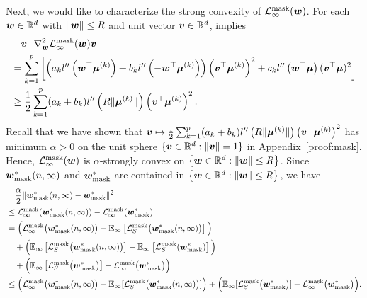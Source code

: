 Next, we would like to characterize the strong convexity of  $\mathcal{L}_\infty^\mathrm{mask}(\vw)$.
For each $\vw \in \mathbb{R}^d$ with $\lVert \vw \rVert \leq R$ and unit vector $\vv \in \mathbb{R}^d$,   implies
\begin{align*}
 &\quad \vv^\top \nabla_\vw^2 \mathcal{L}_\infty^\mathrm{mask}(\vw)\vv \\
 &=  \sum_{k=1}^p \left[ \left(a_k l''\left(\vw^\top \vmu^{(k)}\right) + b_k l''\left(-\vw^\top \vmu^{(k)}\right)\right) \left(\vv^\top \vmu^{(k)}\right)^2 + c_k l''\left(\vw^\top \vmu \right)(\vv^\top \vmu)^2 \right]\\
 &\geq \frac{1}{2} \sum_{k=1}^p (a_k + b_k) l''\left (R\lVert \vmu^{(k)}\rVert \right) \left(\vv^\top \vmu^{(k)} \right)^2.
\end{align*}
Recall that we have shown that $\vv \mapsto \frac{1}{2} \sum_{k=1}^p (a_k + b_k) l''\left ( R\lVert \vmu^{(k)}\rVert \right) \left(\vv^\top \vmu^{(k)} \right)^2$ has minimum $\alpha>0$ on the unit sphere $\{ \vv \in \mathbb{R}^d:\lVert \vv\rVert=1 \}$ in Appendix~\ref{proof:mask}. Hence, $\mathcal{L}_\infty^\mathrm{mask}(\vw)$ is $\alpha$-strongly convex on $\left \{\vw\in \mathbb{R}^d : \lVert \vw \rVert \leq R \right \}$. Since $ \wmask[\infty]$ and $\vw_{\mathrm{mask}}^*$ are contained in $ \left \{\vw\in \mathbb{R}^d : \lVert \vw \rVert \leq R \right \}$, we have
\begin{align*}
    &\quad \frac{\alpha}{2} \lVert \wmask[\infty] - \vw_{\mathrm{mask}}^* \rVert^2\\
    &\leq \mathcal{L}_\infty^{\mathrm{mask}}(\wmask[\infty]) - \mathcal{L}_\infty^{\mathrm{mask}}(\vw_{\mathrm{mask}}^*)\\
    &= \Big( \mathcal{L}_\infty^{\mathrm{mask}}\big(\wmask[\infty]\big)-\mathbb{E}_\infty \left [\lossmask \big (\wmask[\infty] \big) \right ]\Big) \\
    &\quad + \Big(\mathbb{E}_\infty \left [\lossmask \big (\wmask[\infty] \big) \right ]-\mathbb{E}_\infty \left [\lossmask (\vw_{\mathrm{mask}}^*  ) \right ] \Big)\\
    &\quad +\Big( \mathbb{E}_\infty \left [\lossmask\big(\vw_{\mathrm{mask}}^*\big) \right ] - \mathcal{L}_\infty^{\mathrm{mask}}\big(\vw_{\mathrm{mask}}^*\big) \Big)\\
    &\leq \Big( \mathcal{L}_\infty^{\mathrm{mask}}\big(\wmask[\infty]\big)-\mathbb{E}_\infty[\lossmask\big(\wmask[\infty]\big)]\Big)
    +\Big( \mathbb{E}_\infty[\lossmask\big(\vw_{\mathrm{mask}}^*\big)] - \mathcal{L}_\infty^{\mathrm{mask}}\big(\vw_{\mathrm{mask}}^*\big) \Big).
\end{align*}
